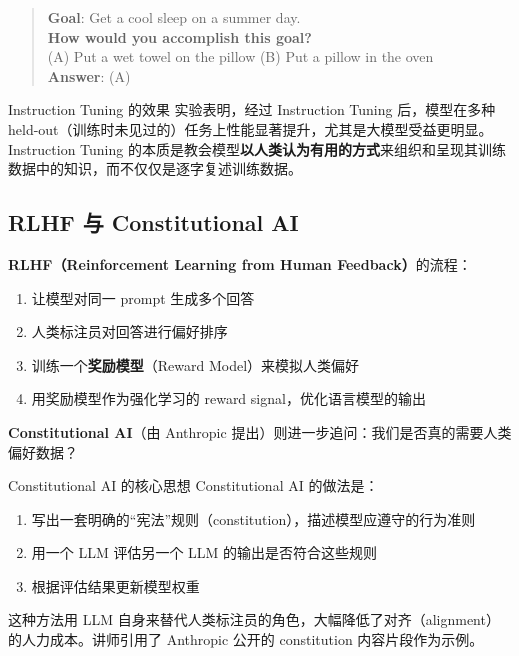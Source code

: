 \begin{quote}
\textbf{Goal}: Get a cool sleep on a summer day. \\
\textbf{How would you accomplish this goal?} \\
(A) Put a wet towel on the pillow \quad (B) Put a pillow in the oven \\
\textbf{Answer}: (A)
\end{quote}

\begin{importantbox}{Instruction Tuning 的效果}
实验表明，经过 Instruction Tuning 后，模型在多种 held-out（训练时未见过的）任务上性能显著提升，尤其是大模型受益更明显。Instruction Tuning 的本质是教会模型\textbf{以人类认为有用的方式}来组织和呈现其训练数据中的知识，而不仅仅是逐字复述训练数据。
\end{importantbox}

\subsection{RLHF 与 Constitutional AI}

\textbf{RLHF（Reinforcement Learning from Human Feedback）}的流程：
\begin{enumerate}
    \item 让模型对同一 prompt 生成多个回答
    \item 人类标注员对回答进行偏好排序
    \item 训练一个\textbf{奖励模型}（Reward Model）来模拟人类偏好
    \item 用奖励模型作为强化学习的 reward signal，优化语言模型的输出
\end{enumerate}

\textbf{Constitutional AI}（由 Anthropic 提出）则进一步追问：我们是否真的需要人类偏好数据？

\begin{knowledgebox}{Constitutional AI 的核心思想}
Constitutional AI 的做法是：
\begin{enumerate}
    \item 写出一套明确的``宪法''规则（constitution），描述模型应遵守的行为准则
    \item 用一个 LLM 评估另一个 LLM 的输出是否符合这些规则
    \item 根据评估结果更新模型权重
\end{enumerate}
这种方法用 LLM 自身来替代人类标注员的角色，大幅降低了对齐（alignment）的人力成本。讲师引用了 Anthropic 公开的 constitution 内容片段作为示例。
\end{knowledgebox}

